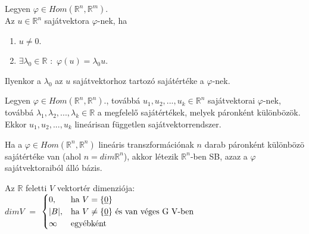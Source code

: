 	\begin{frame}
		\begin{tcolorbox}[title={Def.: Sajtávektor, sajátérték}]
 			 Legyen $\varphi \in Hom(\mathbb{R}^n, \mathbb{R}^m)$.\\
 			 Az $u \in \mathbb{R}^n$ sajátvektora $\varphi$-nek, ha\\
 			 
 			 \begin{enumerate}
 			 \item $u \neq 0$.
			 \item ${\exists}{\lambda}_0 \in \mathbb{R}$ $:$ $\varphi(u) = {\lambda}_0u$.
 			 \end{enumerate}

			 Ilyenkor a ${\lambda}_0$ az $u$ sajátvektorhoz tartozó sajátértéke a $\varphi$-nek.
		\end{tcolorbox}	
		
		\begin{tcolorbox}[title={Tétel: Sajátvektor, sajátérték, lineáris függetlenség}]
 			Legyen $\varphi \in Hom(\mathbb{R}^n, \mathbb{R}^n)$., továbbá $u_1, u_2, ..., u_k \in \mathbb{R}^n$ sajátvektorai $\varphi$-nek, továbbá ${\lambda}_1, {\lambda}_2, ..., {\lambda}_k \in \mathbb{R}$ a megfelelő sajátértékek, melyek páronként különbözök.\\
 			
 			Ekkor $u_1, u_2, ..., u_k$ lineárisan független sajátvektorrendszer.
		\end{tcolorbox}	
		
		\begin{tcolorbox}[title={Tétel: Sajátérték, sakátbázis}]
 			Ha a $\varphi \in Hom(\mathbb{R}^n, \mathbb{R}^n)$ lineáris transzformációnak $n$ darab páronként különbözö sajátértéke van (ahol $n = dim \mathbb{R}^n$), akkor létezik $\mathbb{R}^n$-ben SB, azaz a $\varphi$ sajátvektoraiból álló bázis.
		\end{tcolorbox}	
		
		\begin{tcolorbox}[title={Def.: Vektortér dimenziója}]
 			Az $\mathbb{R}$ feletti $V$ vektortér dimenziója:\\
 			
			$dim V$ $=$ $\begin{cases}
   				0,				& \text{ha } V = \{ \underline{0} \}\\
    				|B|,                & \text{ha } V \neq \{ \underline{0} \} \text{ és van véges G V-ben } \\
    				\infty  & \text{egyébként}
			\end{cases}$	
		\end{tcolorbox}	
		

\end{frame}
